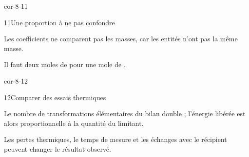 \begin{blocLivre}{cor-8-11}\begin{corrige}{11}{Une proportion à ne pas confondre}
\begin{questions}
\item Les coefficients ne comparent pas les masses, car les entités n’ont pas la même masse.
\item Il faut deux moles de  pour une mole de .
\end{questions}
\end{corrige}\end{blocLivre}
\begin{blocLivre}{cor-8-12}\begin{corrige}{12}{Comparer des essais thermiques}
\begin{questions}
\item Le nombre de transformations élémentaires du bilan double ; l’énergie libérée est alors proportionnelle à la quantité du limitant.
\item Les pertes thermiques, le temps de mesure et les échanges avec le récipient peuvent changer le résultat observé.
\end{questions}
\end{corrige}\end{blocLivre}

